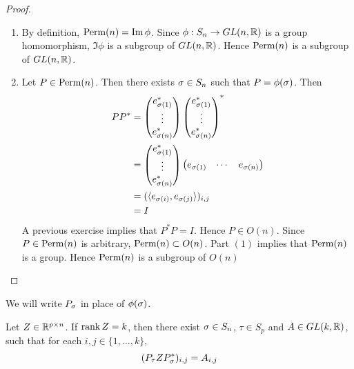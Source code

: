 \documentclass{book}
\begin{document}
	\begin{proof}\
		\begin{enumerate}
			\item By definition, $\text{Perm}(n) = \text{Im} \, \phi$. Since $\phi: S_n \rightarrow GL(n, \mathbb{R})$ is a group homomorphism, $\Im \phi$ is a subgroup of $GL(n, \mathbb{R})$. Hence $\text{Perm}(n)$ is a subgroup of $GL(n, \mathbb{R})$.
			\item Let $P \in \text{Perm}(n)$. Then there exists $\sigma \in S_n$ such that $P = \phi(\sigma)$. Then 
			\begin{align*}
				PP^*
				& = 
				\begin{pmatrix}
					e_{\sigma(1)}^* \\
					\vdots \\
					e_{\sigma(n)}^*
				\end{pmatrix} 
				\begin{pmatrix}
					e_{\sigma(1)}^* \\
					\vdots \\
					e_{\sigma(n)}^*
				\end{pmatrix} ^* \\
				& = \begin{pmatrix}
					e_{\sigma(1)}^* \\
					\vdots \\
					e_{\sigma(n)}^*
				\end{pmatrix} 
				\begin{pmatrix}
					e_{\sigma(1)} & \cdots & e_{\sigma(n)}
				\end{pmatrix} \\
				& = (\langle e_{\sigma(i)}, e_{\sigma(j)} \rangle)_{i,j} \\
				& = I
			\end{align*}
			A previous exercise implies that $P^*P = I$. Hence $P \in O(n)$. Since $P \in \text{Perm}(n)$ is arbitrary, $\text{Perm}(n) \subset O(n)$. Part $(1)$ implies that $\text{Perm}(n)$ is a group. Hence $\text{Perm}(n)$ is a subgroup of $O(n)$
		\end{enumerate}
	\end{proof}

	\begin{note}
		We will write $P_{\sigma}$ in place of $\phi(\sigma)$.
	\end{note}

	\begin{ex} 
		Let $Z \in \mathbb{R}^{p \times n}$. If $\operatorname{\text{rank}} Z = k$, then there exist $\sigma \in S_n$, $\tau \in S_p$ and $A \in GL(k, \mathbb{R})$, such that for each $i,j \in \{1, \ldots, k\}$,
		$$(P_{\tau} Z P^*_{\sigma})_{i, j} = A_{i,j} $$
	\end{ex}
\end{document}
